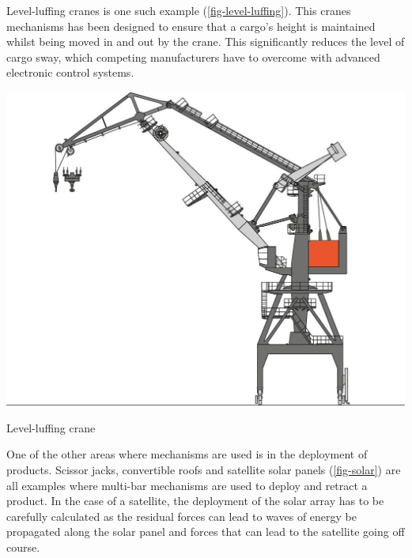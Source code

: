 Level-luffing cranes is one such example (\cref{fig-level-luffing}). This cranes mechanisms has been designed to ensure that a cargo's height is maintained whilst being moved in and out by the crane. This significantly reduces the level of cargo sway, which competing manufacturers have to overcome with advanced electronic control systems. 

\begin{marginfigure}[-10em]
  \centering
  \includegraphics[width=\textwidth]{figs/Kondor4c.jpg}
  \caption{Level-luffing crane}
  \label{fig-level-luffing}
\end{marginfigure}

 One of the other areas where mechanisms are used is in the deployment of products. Scissor jacks, convertible roofs and satellite solar panels (\cref{fig-solar}) are all examples where multi-bar mechanisms are used to deploy and retract a product. In the case of a satellite, the deployment of the solar array has to be carefully calculated as the residual forces can lead to waves of energy be propagated along the solar panel and forces that can lead to the satellite going off course.

